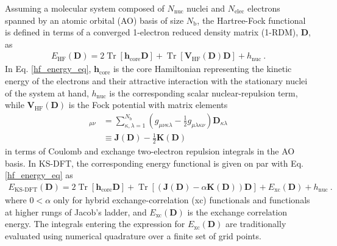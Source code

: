 \documentclass[journal=jctc,manuscript=article]{achemso}
\DeclareMathOperator{\tr}{Tr}
\begin{document}
Assuming a molecular system composed of $N_{\text{nuc}}$ nuclei and $N_{\text{elec}}$ electrons spanned by an atomic orbital (AO) basis of size $N_{\text{b}}$, the Hartree-Fock functional is defined in terms of a converged 1-electron reduced density matrix (1-RDM), $\bm{D}$, as~\cite{mest}
%
\begin{align}
E_{\text{HF}}(\bm{D}) = 2\tr[\bm{h}_{\text{core}}\bm{D}] + \tr[\bm{V}_{\text{HF}}(\bm{D})\bm{D}] + h_{\text{nuc}} \ . \label{hf_energy_eq}
\end{align}
%
In Eq. \ref{hf_energy_eq}, $\bm{h}_{\text{core}}$ is the core Hamiltonian representing the kinetic energy of the electrons and their attractive interaction with the stationary nuclei of the system at hand, $h_{\text{nuc}}$ is the corresponding scalar nuclear-repulsion term, while $\bm{V}_{\text{HF}}(\bm{D})$ is the Fock potential with matrix elements
%
\begin{align}
[\bm{V}_{\text{HF}}(\bm{D})]_{\mu\nu} &= \sum^{N_{\text{b}}}_{\kappa,\lambda=1}(g_{\mu\nu\kappa\lambda} - \tfrac{1}{2}g_{\mu\lambda\kappa\nu})\bm{D}_{\kappa\lambda} \nonumber \\
&\equiv \bm{J}(\bm{D}) - \tfrac{1}{2}\bm{K}(\bm{D}) \label{fock_potential_eq}
\end{align}
%
in terms of Coulomb and exchange two-electron repulsion integrals in the AO basis. In KS-DFT, the corresponding energy functional is given on par with Eq. \ref{hf_energy_eq} as
%
\begin{align}
E_{\text{KS-DFT}}(\bm{D}) = 2\tr[\bm{h}_{\text{core}}\bm{D}] + \tr[(\bm{J}(\bm{D}) - \alpha\bm{K}(\bm{D}))\bm{D}] + E_{\text{xc}}(\bm{D}) + h_{\text{nuc}} \ . \label{ks_dft_energy_eq}
\end{align}
%
where $0 < \alpha$ only for hybrid exchange-correlation (xc) functionals and functionals at higher rungs of Jacob's ladder, and $E_{\text{xc}}(\bm{D})$ is the exchange correlation energy. The integrals entering the expression for $E_{\text{xc}}(\bm{D})$ are traditionally evaluated using numerical quadrature over a finite set of grid points.\\
\end{document}
